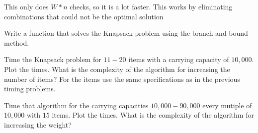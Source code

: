 This only does $W*n$ checks, so it is a lot faster. This works by eliminating combinations that could not be the optimal solution

\begin{problem}
Write a function that solves the Knapsack problem using the branch and bound method.
\end{problem}

\begin{problem}
Time the Knapsack problem for $11-20$ items with a carrying capacity of $10,000$. Plot the times. What is the complexity of the algorithm for increasing the number of items? For the items use the same specifications as in the previous timing problems.
\end{problem}

\begin{problem}
Time that algorithm for the carrying capacities $10,000-90,000$ every mutiple of $10,000$ with $15$ items. Plot the times. What is the complexity of the algorithm for increasing the weight?
\end{problem}
